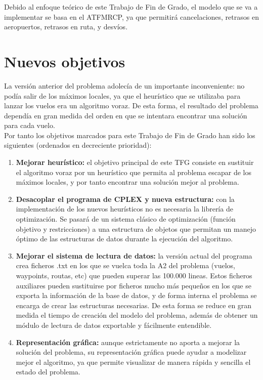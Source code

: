 Debido al enfoque teórico de este Trabajo de Fin de Grado, el modelo que se va a implementar se basa en el ATFMRCP, ya que permitirá cancelaciones, retrasos en aeropuertos, retrasos en ruta, y desvíos. 

\section{Nuevos objetivos}
La versión anterior del problema adolecía de un importante inconveniente: no podía salir de los máximos locales, ya que el heurístico que se utilizaba para lanzar los vuelos era un algoritmo voraz. De esta forma, el resultado del problema dependía en gran medida del orden en que se intentara encontrar una solución para cada vuelo.\\

Por tanto los objetivos marcados para este Trabajo de Fin de Grado han sido los siguientes (ordenados en decreciente prioridad):
\begin{enumerate}
	\item \textbf{Mejorar heurístico: }el objetivo principal de este TFG consiste en sustituir el algoritmo voraz por un heurístico que permita al problema escapar de los máximos locales, y por tanto encontrar una solución mejor al problema.
	\item \textbf{Desacoplar el programa de CPLEX y nueva estructura: }con la implementación de los nuevos heurísticos no es necesaria la librería de optimización. Se pasará de un sistema clásico de optimización (función objetivo y restricciones) a una estructura de objetos que permitan un manejo óptimo de las estructuras de datos durante la ejecución del algoritmo.
	\item \textbf{Mejorar el sistema de lectura de datos: }la versión actual del programa crea ficheros .txt en los que se vuelca toda la A2 del problema (vuelos, waypoints, routas, etc) que pueden superar las 100.000 lineas. Estos ficheros auxiliares pueden sustituirse por ficheros mucho más pequeños en los que se exporta la información de la base de datos, y de forma interna el problema se encarga de crear las estructuras necesarias. De esta forma se reduce en gran medida el tiempo de creación del modelo del problema, además de obtener un módulo de lectura de datos exportable y fácilmente entendible.
	\item \textbf{Representación gráfica: }aunque estrictamente no aporta a mejorar la solución del problema, su representación gráfica puede ayudar a modelizar mejor el algoritmo, ya que permite visualizar de manera rápida y sencilla el estado del problema.
\end{enumerate}